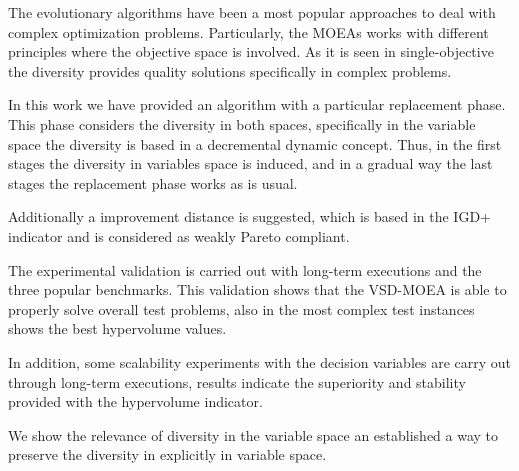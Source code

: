 The evolutionary algorithms have been a most popular approaches to deal with complex optimization problems.
%
Particularly, the MOEAs works with different principles where the objective space is involved.
%
As it is seen in single-objective the diversity provides quality solutions specifically in complex problems.
%

In this work we have provided an algorithm with a particular replacement phase.
%
This phase considers the diversity in both spaces, specifically in the variable space the diversity is based in a decremental dynamic concept.
%
Thus, in the first stages the diversity in variables space is induced, and in a gradual way the last stages the replacement phase works as is usual.
%

Additionally a improvement distance is suggested, which is based in the IGD+ indicator and is considered as weakly Pareto compliant.
%

The experimental validation is carried out with long-term executions and the three popular benchmarks.
%
This validation shows that the VSD-MOEA is able to properly solve overall test problems, also in the most complex test instances shows the best hypervolume values.
%

In addition, some scalability experiments with the decision variables are carry out through long-term executions, results indicate the superiority and stability provided with the hypervolume indicator.

We show the relevance of diversity in the variable space an established a way to preserve the diversity in explicitly in variable space.
